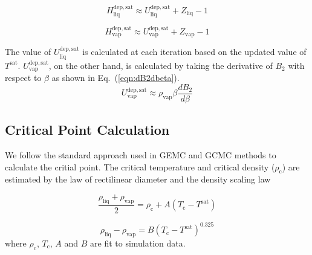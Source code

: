 \documentclass[5p,times]{elsarticle}
\begin{document}
\begin{equation}
H^{\mathrm{dep,sat}}_\mathrm{liq} \approx U^{\mathrm{dep, sat}}_\mathrm{liq}+Z_\mathrm{liq} - 1
\label{eqn:HsatLiq}
\end{equation}

\begin{equation}
H^{\mathrm{dep,sat}}_\mathrm{vap} \approx U^{\mathrm{dep, sat}}_\mathrm{vap}+Z_\mathrm{vap} - 1
\label{eqn:HsatVap}
\end{equation}

The value of $U^{\mathrm{dep, sat}}_\mathrm{liq}$ is calculated at each iteration based on the updated value of $T^{\mathrm{sat}}$. $U^{\mathrm{dep, sat}}_\mathrm{vap}$, on the other hand, is calculated by taking the derivative of $B_2$ with respect to $\beta$ as shown in Eq.~(\ref{eqn:dB2dbeta}).
\begin{equation}
U^{\mathrm{dep, sat}}_\mathrm{vap}\approx \rho_{\mathrm{vap}} \beta \frac{dB_2}{d\beta}
\label{eqn:dB2dbeta}
\end{equation}

\subsection{Critical Point Calculation}\label{sec:PcCalc}
We follow the standard approach used in GEMC and GCMC methods to calculate the critial point. The critical temperature and critical density ($\rho_\mathrm{c}$) are estimated by the law of rectilinear diameter \cite{Rowlinson1982} and the density scaling law \cite{Rowlinson2013}

\begin{equation}
\frac{\rho_{\mathrm{liq}} +\rho_{\mathrm{vap}}}{2}=\rho_\mathrm{c}+A(T_\mathrm{c}-T^{\mathrm{sat}})
\label{eqn:rectilinearLaw}
\end{equation}

\begin{equation}
\rho_{\mathrm{liq}} -\rho_{\mathrm{vap}}=B(T_\mathrm{c}-T^{\mathrm{sat}})^{0.325}
\label{eqn:scalingLaw}
\end{equation}
where $\rho_\mathrm{c}$, $ T_\mathrm{c}$, $A$ and $B$ are fit to simulation data.

			
\end{document}
